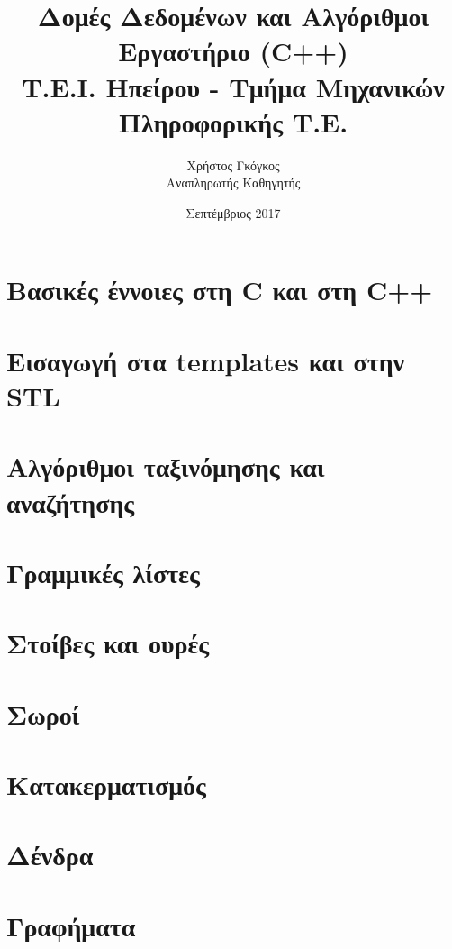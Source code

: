 \documentclass[11pt,a4paper]{book}
\title{Δομές Δεδομένων και Αλγόριθμοι \\ Εργαστήριο (C++)\\ Τ.Ε.Ι. Ηπείρου - Τμήμα Μηχανικών Πληροφορικής Τ.Ε.}
\author{Χρήστος Γκόγκος  \\ Αναπληρωτής Καθηγητής }
\date{Σεπτέμβριος 2017}
\begin{document}
\frontmatter
\maketitle
\tableofcontents
\mainmatter

\chapter{Βασικές έννοιες στη C και στη C++}


\chapter{Εισαγωγή στα templates και στην STL}


\chapter{Αλγόριθμοι ταξινόμησης και αναζήτησης}

\chapter{Γραμμικές λίστες}

\chapter{Στοίβες και ουρές}

\chapter{Σωροί}

\chapter{Κατακερματισμός}

\chapter{Δένδρα}

\chapter{Γραφήματα}

\begin{versionhistory}
\end{versionhistory}
\end{document}
